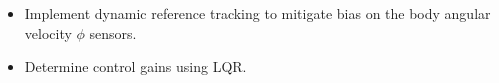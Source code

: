 \documentclass[crop=false,float=true,class=scrreprt]{standalone}
\begin{document}
\begin{enumerate}[leftmargin=*]
\begin{itemize}[leftmargin=*, label=$\cdot$]
  \item Implement dynamic reference tracking to mitigate bias on the body angular velocity $\phi$ sensors.
  
  \item Determine control gains using LQR.
  
\end{itemize}

\end{enumerate}




\clearpage




\printbibliography[segment=\therefsegment, heading=subbibnumbered, title={Bibliography}]




\clearpage
\end{document}
